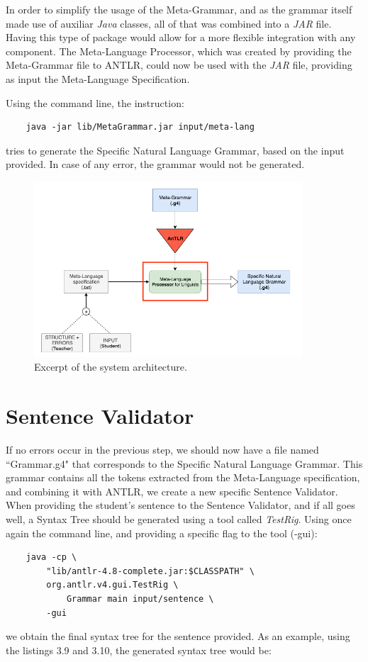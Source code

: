 In order to simplify the usage of the Meta-Grammar, and as the grammar itself made use of auxiliar \emph{Java} classes, all of that was combined into a \emph{JAR} file.
Having this type of package would allow for a more flexible integration with any component.
The Meta-Language Processor, which was created by providing the Meta-Grammar file to ANTLR, could now be used with the \emph{JAR} file, 
providing as input the Meta-Language Specification. 

Using the command line, the instruction:
\begin{Verbatim}
	java -jar lib/MetaGrammar.jar input/meta-lang
\end{Verbatim}
\noindent tries to generate the Specific Natural Language Grammar, based on the input provided. In case of any error, the grammar would not be generated.

\begin{figure}[h]
    \centering
    \includegraphics[width=10cm]{images/system_meta_processor.png}
    \caption{Excerpt of the system architecture.}
    \label{fig:system_architecture}
\end{figure}

\section{Sentence Validator}

If no errors occur in the previous step, we should now have a file named ``Grammar.g4" that corresponds to the Specific Natural Language Grammar.
This grammar contains all the tokens extracted from the Meta-Language specification, and combining it with ANTLR, we create a new specific Sentence Validator.
When providing the student's sentence to the Sentence Validator, and if all goes well, a Syntax Tree should be generated using a tool called \emph{TestRig}.
Using once again the command line, and providing a specific flag to the tool (-gui):
\begin{Verbatim}
	java -cp \ 
		"lib/antlr-4.8-complete.jar:$CLASSPATH" \ 
		org.antlr.v4.gui.TestRig \ 
			Grammar main input/sentence \ 
		-gui
\end{Verbatim}
\noindent we obtain the final syntax tree for the sentence provided. 
As an example, using the listings 3.9 and 3.10, the generated syntax tree would be:

